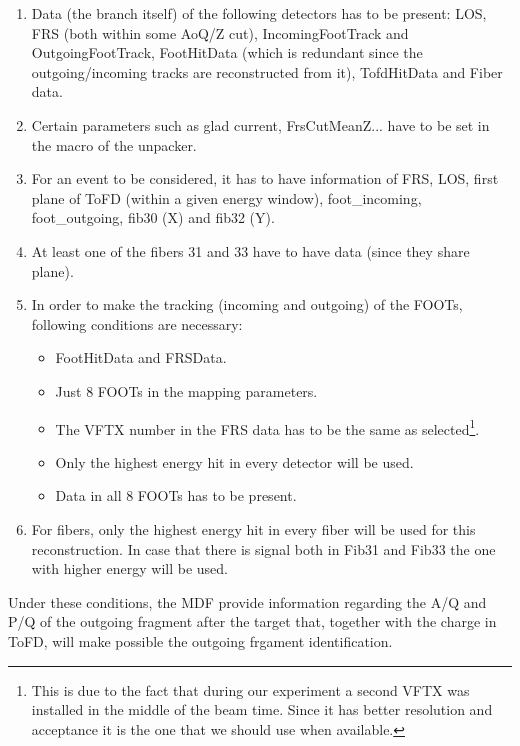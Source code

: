 \documentclass[12pt,a4paper]{article}
\begin{document}
\begin{enumerate}
    \item Data (the branch itself) of the following detectors has to be present: LOS, FRS (both within some AoQ/Z cut), IncomingFootTrack and OutgoingFootTrack, FootHitData (which is redundant since the outgoing/incoming tracks are reconstructed from it), TofdHitData and Fiber data.

    \item Certain parameters such as glad current, FrsCutMeanZ... have to be set in the macro of the unpacker.

    \item For an event to be considered, it has to have information of FRS, LOS, first plane of ToFD (within a given energy window), foot\_incoming, foot\_outgoing, fib30 (X) and fib32 (Y).

    \item At least one of the fibers 31 and 33 have to have data (since they share plane).

    \item In order to make the tracking (incoming and outgoing) of the FOOTs, following conditions are necessary:

          \begin{itemize}
              \item FootHitData and FRSData.
              \item Just 8 FOOTs in the mapping parameters.
              \item The VFTX number in the FRS data has to be the same as selected\footnote{This is due to the fact that during our experiment a second VFTX was installed in the middle of the beam time. Since it has better resolution and acceptance it is the one that we should use when available.}.
              \item Only the highest energy hit in every detector will be used.
              \item Data in all 8 FOOTs has to be present.
          \end{itemize}

    \item For fibers, only the highest energy hit in every fiber will be used for this reconstruction. In case that there is signal both in Fib31 and Fib33 the one with higher energy will be used.
\end{enumerate}

Under these conditions, the MDF provide information regarding the A/Q and P/Q of the outgoing fragment after the target that, together with the charge in ToFD, will make possible the outgoing frgament identification.
\end{document}
